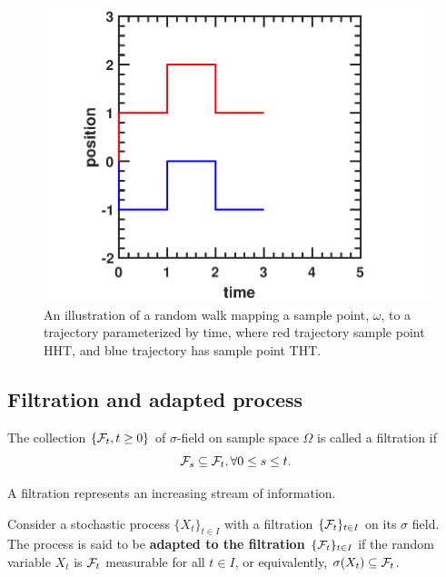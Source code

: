 \begin{refsection}
\begin{figure}[H]
\centering
\includegraphics[width=0.7\linewidth]{figures/stochasticProcess/stochasticProcess/randomWalkPaths}
\caption{An illustration of a random walk mapping a sample point, $\omega$, to a trajectory parameterized by time, where red trajectory sample point HHT, and blue trajectory has sample point THT.}
\label{ch:theory-of-stochastic-process:fig:randomWalkPaths}
\end{figure}




\subsection{Filtration and adapted process}
\begin{definition}[filtration]
The collection $\{\mathcal{F}_t,t\geq 0\}$ of $\sigma$-field on sample space $\Omega$ is called a filtration if
$$\mathcal{F}_s \subseteq \mathcal{F}_t,\forall 0 \leq s \leq t.$$
\end{definition}

\begin{remark}
	A filtration represents an increasing stream of information.
\end{remark}

\begin{definition}
\cite[77]{mikosch1998elementary}Consider a stochastic process $\{X_t\}_{t\in I}$ with a filtration $\{\mathcal{F}_t\}_{t\in I}$ on its $\sigma$ field. The process is said to be \textbf{adapted to the filtration $\{\mathcal{F}_t\}_{t\in I}$} if the random variable $X_t$ is $\mathcal{F}_t$ measurable for all $t\in I$, or equivalently, $\sigma(X_t) \subseteq \mathcal{F}_t$.
\end{definition}


\end{refsection}

